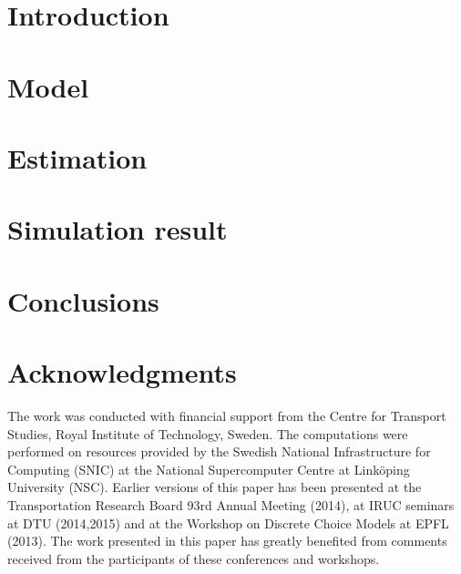 \documentclass[final,pdftex]{Oskarthesis}
\numberwithin{equation}{section}
\begin{document}
\section{Introduction}

\section{Model}\label{seq:model} 

\section{Estimation}



\section{Simulation result}

\FloatBarrier


\section{Conclusions}


\section*{Acknowledgments}
The work was conducted with financial support from the Centre for Transport Studies, Royal Institute of Technology, Sweden. The computations were performed on resources provided by the Swedish National Infrastructure for Computing (SNIC) at the National Supercomputer Centre at Link\"oping University (NSC). Earlier versions of this paper has been presented at the Transportation Research Board 93rd Annual Meeting (2014), at IRUC seminars at DTU (2014,2015) and at the Workshop on Discrete Choice Models at EPFL (2013). The work presented in this paper has greatly benefited from comments received from the participants of these conferences and workshops.

\footnotesize


%

%
\end{document}
